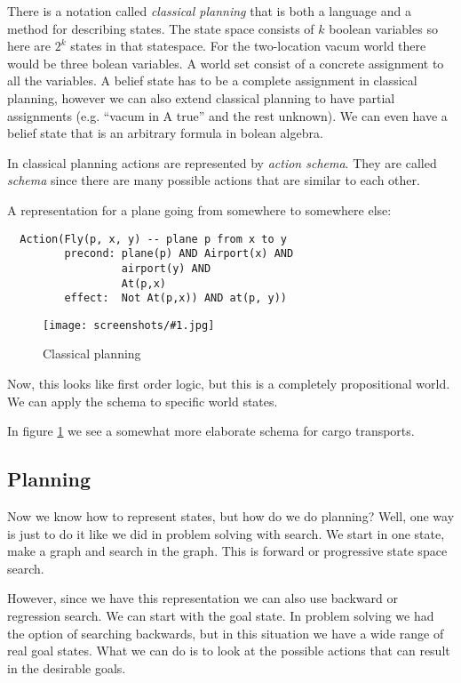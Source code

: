 \documentclass[a4, 12pt, english, USenglish]{scrreprt}
\newcommand{\screenshot}[2]{
\begin{figure}[htb]
\texttt{[image: screenshots/\#1.jpg]}
\label{#1}
\caption{#2}
\end{figure}}
\newcommand{\idx}[1]{{\em #1}\index{#1}}
\begin{document}
There is a notation called \idx{classical planning} that is both a
language and a method for describing states.   The state space
consists of \(k\) boolean variables so here are \(2^k\) states in that
statespace.  For the two-location vacum world there would be three
bolean variables.   A world set consist of a concrete assignment to
all the variables.  A belief state has to be a complete assignment in
classical planning, however we can also extend classical planning to
have partial assignments (e.g. ``vacum in A true'' and the rest
unknown).  We can even have a belief state that is an arbitrary
formula in bolean algebra.

In classical planning actions are represented by \idx{action schema}.
They are called \idx{schema} since there are many possible actions
that are similar to each other.

A representation for  a plane going from somewhere to somewhere
else: 

\begin{verbatim}
  Action(Fly(p, x, y) -- plane p from x to y
         precond: plane(p) AND Airport(x) AND
                  airport(y) AND
                  At(p,x)
         effect:  Not At(p,x)) AND at(p, y))
\end{verbatim}

\screenshot{classicalplanning}{Classical planning}

Now, this looks like first order logic, but this is a completely
propositional world.  We can apply the schema to specific world
states.

In figure \ref{classicalplanning} we see a somewhat more elaborate
schema for cargo transports.

\subsection{Planning}

Now we know how to represent states, but how do we do planning?  Well,
one way is just to do it like we did in problem solving with
search. We start in one state, make a graph and search in the graph.
This is forward or progressive state space search.

However, since we have this representation we can also use backward or
regression search.  We can start with the goal state.  In problem
solving we had the option of searching backwards, but in this
situation we have a wide range of real goal states. What we can do is
to look at the possible actions that can result in the desirable
goals.
\end{document}
